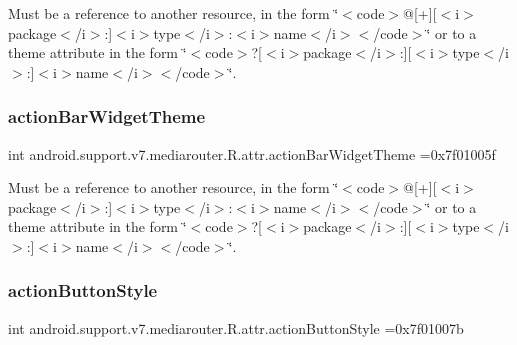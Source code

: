 Must be a reference to another resource, in the form \char`\"{}$<$code$>$@\mbox{[}+\mbox{]}\mbox{[}$<$i$>$package$<$/i$>$\+:\mbox{]}$<$i$>$type$<$/i$>$\+:$<$i$>$name$<$/i$>$$<$/code$>$\char`\"{} or to a theme attribute in the form \char`\"{}$<$code$>$?\mbox{[}$<$i$>$package$<$/i$>$\+:\mbox{]}\mbox{[}$<$i$>$type$<$/i$>$\+:\mbox{]}$<$i$>$name$<$/i$>$$<$/code$>$\char`\"{}. \mbox{\label{classandroid_1_1support_1_1v7_1_1mediarouter_1_1R_1_1attr_a30c01c594c458f768506beeede0d3133}} 
\subsubsection{\texorpdfstring{action\+Bar\+Widget\+Theme}{actionBarWidgetTheme}}
{\footnotesize\ttfamily int android.\+support.\+v7.\+mediarouter.\+R.\+attr.\+action\+Bar\+Widget\+Theme =0x7f01005f\hspace{0.3cm}{\ttfamily [static]}}

Must be a reference to another resource, in the form \char`\"{}$<$code$>$@\mbox{[}+\mbox{]}\mbox{[}$<$i$>$package$<$/i$>$\+:\mbox{]}$<$i$>$type$<$/i$>$\+:$<$i$>$name$<$/i$>$$<$/code$>$\char`\"{} or to a theme attribute in the form \char`\"{}$<$code$>$?\mbox{[}$<$i$>$package$<$/i$>$\+:\mbox{]}\mbox{[}$<$i$>$type$<$/i$>$\+:\mbox{]}$<$i$>$name$<$/i$>$$<$/code$>$\char`\"{}. \mbox{\label{classandroid_1_1support_1_1v7_1_1mediarouter_1_1R_1_1attr_a67f766676b702c3e5630424752ce1e20}} 
\subsubsection{\texorpdfstring{action\+Button\+Style}{actionButtonStyle}}
{\footnotesize\ttfamily int android.\+support.\+v7.\+mediarouter.\+R.\+attr.\+action\+Button\+Style =0x7f01007b\hspace{0.3cm}{\ttfamily [static]}}

